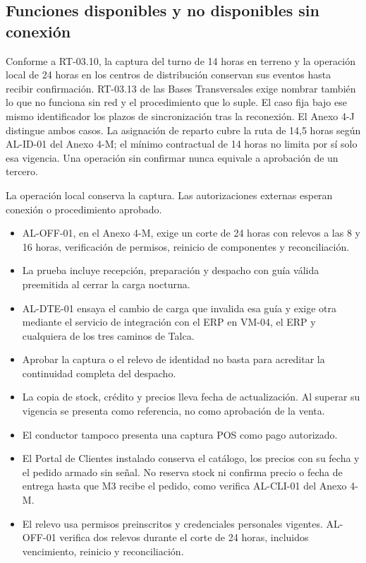 \subsection{Funciones disponibles y no disponibles sin conexión}
\label{sec:funciones-offline}

Conforme a RT-03.10, la captura del turno de 14 horas en terreno y la operación local de 24 horas en los centros de distribución conservan sus eventos hasta recibir confirmación. RT-03.13 de las Bases Transversales exige nombrar también lo que no funciona sin red y el procedimiento que lo suple. El caso fija bajo ese mismo identificador los plazos de sincronización tras la reconexión. El Anexo 4-J distingue ambos casos. La asignación de reparto cubre la ruta de 14,5 horas según AL-ID-01 del Anexo 4-M; el mínimo contractual de 14 horas no limita por sí solo esa vigencia. Una operación sin confirmar nunca equivale a aprobación de un tercero.


La operación local conserva la captura. Las autorizaciones externas esperan conexión o procedimiento aprobado.

\begin{itemize}
  \item AL-OFF-01, en el Anexo 4-M, exige un corte de 24 horas con relevos a las 8 y 16 horas, verificación de permisos, reinicio de componentes y reconciliación.
  \item La prueba incluye recepción, preparación y despacho con guía válida preemitida al cerrar la carga nocturna.
  \item AL-DTE-01 ensaya el cambio de carga que invalida esa guía y exige otra mediante el servicio de integración con el ERP en VM-04, el ERP y cualquiera de los tres caminos de Talca.
  \item Aprobar la captura o el relevo de identidad no basta para acreditar la continuidad completa del despacho.
\end{itemize}

\begin{itemize}
  \item La copia de stock, crédito y precios lleva fecha de actualización. Al superar su vigencia se presenta como referencia, no como aprobación de la venta.
  \item El conductor tampoco presenta una captura POS como pago autorizado.
  \item El Portal de Clientes instalado conserva el catálogo, los precios con su fecha y el pedido armado sin señal. No reserva stock ni confirma precio o fecha de entrega hasta que M3 recibe el pedido, como verifica AL-CLI-01 del Anexo 4-M.
\item El relevo usa permisos preinscritos y credenciales personales vigentes. AL-OFF-01 verifica dos relevos durante el corte de 24 horas, incluidos vencimiento, reinicio y reconciliación.
\end{itemize}

